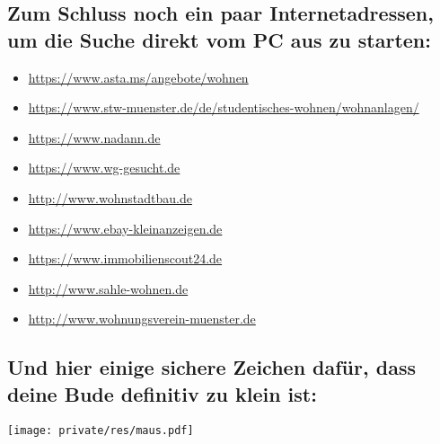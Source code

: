 \begin{multicols*}{2}
\subsection*{Zum Schluss noch ein paar Internetadressen, um die Suche direkt vom PC aus zu starten:}
\vspace{-1ex}
\begin{itemize}[leftmargin=0.8cm]
	\raggedright
	\item \url{https://www.asta.ms/angebote/wohnen}
        \item \url{https://www.stw-muenster.de/de/studentisches-wohnen/wohnanlagen/}
	\item \url{https://www.nadann.de}
	\item \url{https://www.wg-gesucht.de}
	\item \url{http://www.wohnstadtbau.de}
	\item \url{https://www.ebay-kleinanzeigen.de}
	\item \url{https://www.immobilienscout24.de}
	\item \url{http://www.sahle-wohnen.de}
	\item \url{http://www.wohnungsverein-muenster.de}
\end{itemize}

\vspace{-2ex}
\subsection*{Und hier einige sichere Zeichen dafür, dass deine Bude definitiv zu klein ist:}
\hspace{1.5cm}\texttt{[image: private/res/maus.pdf]}

\vspace{-\parskip}\vspace{-0.1cm}
\setlength{\fboxsep}{0.2cm}

\end{multicols*}
